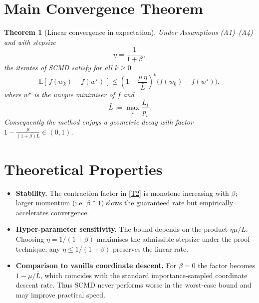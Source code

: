 \documentclass{article}
\newtheorem{theorem}{Theorem}
\newcommand{\E}{\mathbb{E}}
\begin{document}
\section*{Main Convergence Theorem}
\begin{theorem}[Linear convergence in expectation]\label{thm:linear}
Under Assumptions (A1)–(A4) and with stepsize
\[
\eta = \frac{1}{1+\beta},
\tag{T1}
\]
the iterates of SCMD satisfy for all $k\ge0$
\[
\E\!\left[\,f(w_k)-f(w^\star)\,\right]\le
\left(1-\frac{\mu\,\eta}{\bar L}\right)^{k}\!
\bigl(f(w_0)-f(w^\star)\bigr),
\tag{T2}
\]
where $w^\star$ is the unique minimiser of $f$ and
\[
\bar L := \max_{i}\frac{L_i}{p_i}.
\tag{T3}
\]
Consequently the method enjoys a geometric decay with factor
$1-\frac{\mu}{(1+\beta)\bar L}\in(0,1)$.
\end{theorem}

\section*{Theoretical Properties}
\begin{itemize}
\item \textbf{Stability.} The contraction factor in \eqref{T2} is monotone
increasing with $\beta$; larger momentum (i.e. $\beta\!\uparrow\!1$) slows
the guaranteed rate but empirically accelerates convergence.
\item \textbf{Hyper‑parameter sensitivity.}
The bound depends on the product $\eta\mu/\bar L$.
Choosing $\eta=1/(1+\beta)$ maximises the admissible stepsize under the proof
technique; any $\eta\le 1/(1+\beta)$ preserves the linear rate.
\item \textbf{Comparison to vanilla coordinate descent.}
For $\beta=0$ the factor becomes $1-\mu/\bar L$, which coincides with the
standard importance‑sampled coordinate descent rate. Thus SCMD never
performs worse in the worst‑case bound and may improve practical speed.
\end{itemize}
\end{document}
